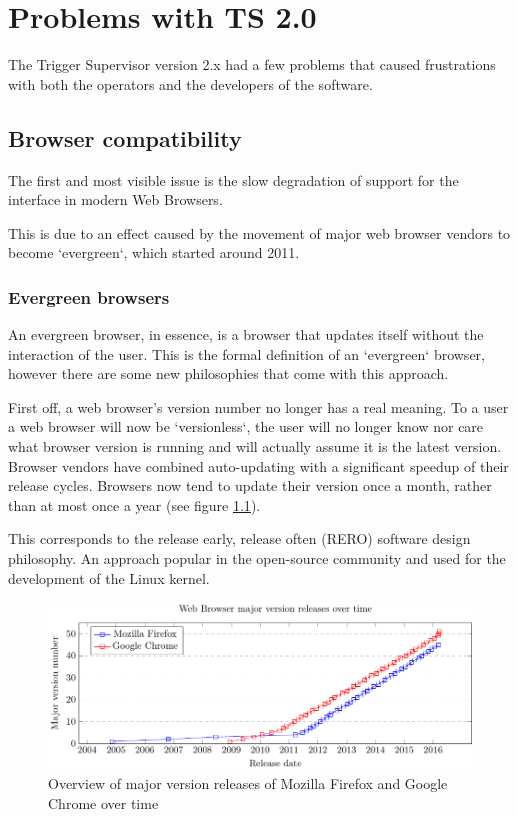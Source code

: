 \chapter{Problems with TS 2.0}
\label{Problems with TS 2.0}
The Trigger Supervisor version 2.x had a few problems that caused
frustrations with both the operators and the developers of the software.

\section{Browser compatibility}
The first and most visible issue is the slow degradation of support for the
interface in modern Web Browsers.

This is due to an effect caused by the movement of major web browser vendors to
become `evergreen`, which started around 2011.

\subsection{Evergreen browsers}
\label{Evergreen browsers}
An evergreen browser, in essence, is a browser that updates itself without the
interaction of the user.
This is the formal definition of an `evergreen` browser, however there are
some new philosophies that come with this approach.

First off, a web browser's version number no longer has a real meaning.
To a user a web browser will now be `versionless`, the user will no longer know
nor care what browser version is running and will actually assume it is the latest
version.
Browser vendors have combined auto-updating with a significant speedup of their
release cycles. Browsers now tend to update their version once a month, rather
than at most once a year (see figure \ref{fig:updateGraph}).

This corresponds to the release early, release often (RERO) software design
philosophy. An approach popular in the open-source community and used for the
development of the Linux kernel\cite{TheCathedralAndTheBazaar}.

\begin{figure}
  \centering
  \includegraphics{images/pgfplots/firefox_update_speed-figure0}
  \caption{Overview of major version releases of Mozilla Firefox and Google Chrome over time}
  \label{fig:updateGraph}
\end{figure}

